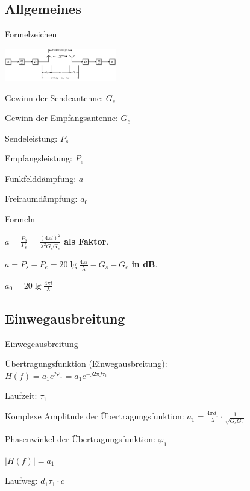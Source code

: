 \documentclass[german]{latex4ei/latex4ei_sheet}
\begin{document}
    \subsection{Allgemeines}
    \begin{sectionbox}
        \begin{symbolbox}{Formelzeichen}
            \item \includegraphics[width=185px]{img/Funkuebertragungssystem.png}
            \item Gewinn der Sendeantenne: $G_s$
            \item Gewinn der Empfangsantenne: $G_e$
            \item Sendeleistung: $P_s$
            \item Empfangsleistung: $P_e$
            \item Funkfelddämpfung: $a$
            \item Freiraumdämpfung: $a_0$
        \end{symbolbox}
        
        \begin{bluebox}{Formeln}
            \item $a = \frac{P_s}{P_e} = \frac{(4\pi l)^2}{\lambda^2 G_e G_s}$ \textbf{als Faktor}.
            \item $a = P_s - P_e = 20\lg \frac{4\pi l}{\lambda}-G_s-G_e$ \textbf{in dB}.
            \item $a_0 = 20\lg \frac{4\pi l}{\lambda}$
        \end{bluebox}
    \end{sectionbox}
    \begin{sectionbox}   
        \subsection{Einwegausbreitung}
    \begin{symbolbox}{Einwegeausbreitung}
        \item Übertragungsfunktion (Einwegausbreitung):\\ $H(f) = a_1 e^{j\varphi_1} = a_1 e^{-j 2 \pi f \tau_1}$
        \item Laufzeit: $\tau_1$
        \item Komplexe Amplitude der Übertragungsfunktion: $a_1 = \frac{4\pi d_1}{\lambda}\cdot \frac{1}{\sqrt{G_s G_e}}$
        \item Phasenwinkel der Übertragungsfunktion: $\varphi_1$
        \item $|H(f)| = a_1$
        \item Laufweg: $d_1\tau_1 \cdot c$
    \end{symbolbox}
\end{sectionbox}
    
\end{document}
